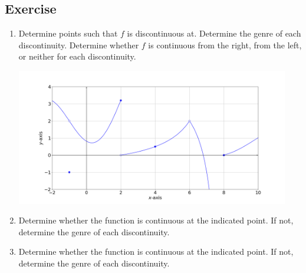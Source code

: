 \documentclass[11pt]{book}
\theoremstyle{break}
\theoremstyle{no_label}
\numberwithin{equation}{section}
\begin{document}
\subsection*{Exercise}

\begin{enumerate}[label=\arabic*.]
    \item Determine points such that $f$ is discontinuous at. Determine the genre of each discontinuity. Determine whether $f$ is continuous from the right, from the left, or neither for each discontinuity.
    \begin{center}
        \includegraphics[width=0.94\textwidth]{continuity_exercise_1.png}
    \end{center}
    \item Determine whether the function is continuous at the indicated point. If not, determine the genre of each discontinuity.
    \begin{enumerate}
    \end{enumerate}
    \item Determine whether the function is continuous at the indicated point. If not, determine the genre of each discontinuity.
    \begin{enumerate}
\end{enumerate}
\end{enumerate}
\end{document}
